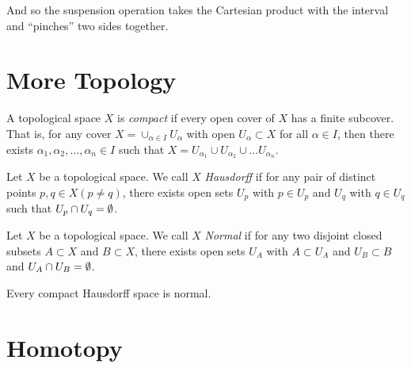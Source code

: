 \documentclass[../sean_thesis.tex]{subfiles}
\begin{document}
And so the suspension operation takes the Cartesian product with the interval and ``pinches'' two sides together.
 

\section{More Topology}

\begin{definition}[Compact]
    A topological space $X$ is \emph{compact} if every open cover of $X$ has a finite subcover. That is, for any cover $X = \cup_{\alpha \in I} U_\alpha$ with open $U_\alpha \subset X$ for all $\alpha \in I$, then there exists $\alpha_1, \alpha_2, \dots, \alpha_n \in I$ such that $X = U_{\alpha_1} \cup U_{\alpha_2} \cup \dots U_{\alpha_n}$.
\end{definition}

\begin{definition}[Hausdorff]
	Let $X$ be a topological space. We call $X$ \emph{Hausdorff} if for any pair of distinct points $p,q \in X (p \neq q)$, there exists open sets $U_p$ with $p \in U_p$ and $U_q$ with $q \in U_q$ such that $U_p \cap U_q = \emptyset$.
\end{definition}

\begin{definition}[Normal]
	Let $X$ be a topological space. We call $X$ \emph{Normal} if for any two disjoint closed subsets $A \subset X$ and $B \subset X$, there exists open sets $U_A$ with $A \subset U_A$ and $U_B \subset B$ and $U_A \cap U_B = \emptyset$. 
\end{definition}

\begin{theorem}
	Every compact Hausdorff space is normal.
\end{theorem}


\section{Homotopy}
\end{document}
